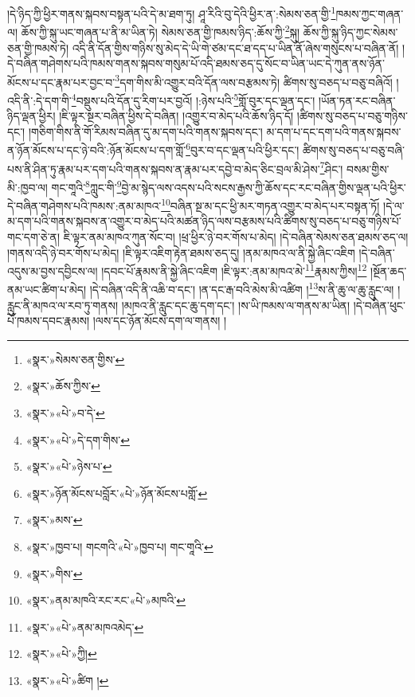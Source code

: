 །དེ་ཉིད་ཀྱི་ཕྱིར་གནས་སྐབས་བསྟན་པའི་དེ་མ་ཐག་ཏུ། ཤཱ་རིའི་བུ་དེའི་ཕྱིར་ན་:སེམས་ཅན་གྱི་\footnote{«སྣར་»སེམས་ཅན་གྱིས་}ཁམས་ཀྱང་གཞན་ལ། ཆོས་ཀྱི་སྐུ་ཡང་གཞན་པ་ནི་མ་ཡིན་ཏེ། སེམས་ཅན་གྱི་ཁམས་ཉིད་:ཆོས་ཀྱི་\footnote{«སྣར་»ཆོས་ཀྱིས་}སྐུ། ཆོས་ཀྱི་སྐུ་ཉིད་ཀྱང་སེམས་ཅན་གྱི་ཁམས་ཏེ། འདི་ནི་དོན་གྱིས་གཉིས་སུ་མེད་དེ་ཡི་གེ་ཙམ་དང་ཐ་དད་པ་ཡིན་ནོ་ཞེས་གསུངས་པ་བཞིན་ནོ། །དེ་བཞིན་གཤེགས་པའི་ཁམས་གནས་སྐབས་གསུམ་པོ་འདི་ཐམས་ཅད་དུ་སོང་བ་ཡིན་ཡང་དེ་ཀུན་ནས་ཉོན་མོངས་པ་དང་རྣམ་པར་བྱང་བ་\footnote{«སྣར་»«པེ་»བ་དེ་}དག་གིས་མི་འགྱུར་བའི་དོན་ལས་བརྩམས་ཏེ། ཚིགས་སུ་བཅད་པ་བཅུ་བཞིའོ། །འདི་ནི་:དེ་དག་གི་\footnote{«སྣར་»«པེ་»དེ་དག་གིས་}བསྡུས་པའི་དོན་དུ་རིག་པར་བྱའོ། །:ཉེས་པའི་\footnote{«སྣར་»«པེ་»ཉེས་པ་}གློ་བུར་དང་ལྡན་དང་། །ཡོན་ཏན་རང་བཞིན་ཉིད་ལྡན་ཕྱིར། །ཇི་ལྟར་སྔར་བཞིན་ཕྱིས་དེ་བཞིན། །འགྱུར་བ་མེད་པའི་ཆོས་ཉིད་དོ། །ཚིགས་སུ་བཅད་པ་བཅུ་གཉིས་དང་། །གཅིག་གིས་ནི་གོ་རིམས་བཞིན་དུ་མ་དག་པའི་གནས་སྐབས་དང་། མ་དག་པ་དང་དག་པའི་གནས་སྐབས་ན་ཉོན་མོངས་པ་དང་ཉེ་བའི་:ཉོན་མོངས་པ་དག་གློ་\footnote{«སྣར་»ཉོན་མོངས་པབློར་«པེ་»ཉོན་མོངས་པགློ་}བུར་བ་དང་ལྡན་པའི་ཕྱིར་དང་། ཚིགས་སུ་བཅད་པ་བཅུ་བཞི་པས་ནི་ཤིན་ཏུ་རྣམ་པར་དག་པའི་གནས་སྐབས་ན་རྣམ་པར་དབྱེ་བ་མེད་ཅིང་བྲལ་མི་ཤེས་\footnote{«སྣར་»མས་}ཤིང་། བསམ་གྱིས་མི་:ཁྱབ་ལ། གང་གཱའི་\footnote{«སྣར་»ཁྱབ་པ། གངགའི་«པེ་»ཁྱབ་པ། གང་གཱའི་}ཀླུང་གི་\footnote{«སྣར་»གིས་}བྱེ་མ་སྙེད་ལས་འདས་པའི་སངས་རྒྱས་ཀྱི་ཆོས་དང་རང་བཞིན་གྱིས་ལྡན་པའི་ཕྱིར་དེ་བཞིན་གཤེགས་པའི་ཁམས་:ནམ་མཁའ་\footnote{«སྣར་»ནམ་མཁའི་རང་རང་«པེ་»མཁའི་}བཞིན་སྔ་མ་དང་ཕྱི་མར་གཏན་འགྱུར་བ་མེད་པར་བསྟན་ཏོ། །དེ་ལ་མ་དག་པའི་གནས་སྐབས་ན་འགྱུར་བ་མེད་པའི་མཚན་ཉིད་ལས་བརྩམས་པའི་ཚིགས་སུ་བཅད་པ་བཅུ་གཉིས་པོ་གང་དག་ཅེ་ན། ཇི་ལྟར་ནམ་མཁའ་ཀུན་སོང་བ། །ཕྲ་ཕྱིར་ཉེ་བར་གོས་པ་མེད། །དེ་བཞིན་སེམས་ཅན་ཐམས་ཅད་ལ། །གནས་འདི་ཉེ་བར་གོས་པ་མེད། །ཇི་ལྟར་འཇིག་རྟེན་ཐམས་ཅད་དུ། །ནམ་མཁའ་ལ་ནི་སྐྱེ་ཞིང་འཇིག །དེ་བཞིན་འདུས་མ་བྱས་དབྱིངས་ལ། །དབང་པོ་རྣམས་ནི་སྐྱེ་ཞིང་འཇིག །ཇི་ལྟར་:ནམ་མཁའ་མེ་\footnote{«སྣར་»«པེ་»ནམ་མཁའམེད་}རྣམས་ཀྱིས།\footnote{«སྣར་»«པེ་»ཀྱི།} །སྔོན་ཆད་ནམ་ཡང་ཚིག་པ་མེད། །དེ་བཞིན་འདི་ནི་འཆི་བ་དང་། །ན་དང་རྒ་བའི་མེས་མི་འཚིག །\footnote{«སྣར་»«པེ་»ཚིག །}ས་ནི་ཆུ་ལ་ཆུ་རླུང་ལ། །རླུང་ནི་མཁའ་ལ་རབ་ཏུ་གནས། །མཁའ་ནི་རླུང་དང་ཆུ་དག་དང་། །ས་ཡི་ཁམས་ལ་གནས་མ་ཡིན། །དེ་བཞིན་ཕུང་པོ་ཁམས་དབང་རྣམས། །ལས་དང་ཉོན་མོངས་དག་ལ་གནས། །
